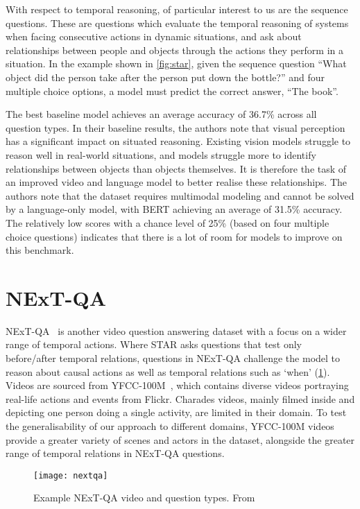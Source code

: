 With respect to temporal reasoning, of particular interest to us are the
sequence questions. These are questions which evaluate the temporal reasoning
of systems when facing consecutive actions in dynamic situations, and ask about
relationships between people and objects through the actions they perform in a
situation. In the example shown in \cref{fig:star}, given the sequence question
``What object did the person take after the person put down the bottle?'' and
four multiple choice options, a model must predict the correct answer, ``The
book''.

The best baseline model achieves an average accuracy of 36.7\% across all
question types. In their baseline results, the authors note that visual
perception has a significant impact on situated reasoning. Existing vision
models struggle to reason well in real-world situations, and models struggle
more to identify relationships between objects than objects themselves. It is
therefore the task of an improved video and language model to better realise
these relationships. The authors note that the dataset requires multimodal
modeling and cannot be solved by a language-only model, with BERT achieving an
average of 31.5\% accuracy. The relatively low scores with a chance level of
25\% (based on four multiple choice questions) indicates that there is a lot of
room for models to improve on this benchmark.

\section{NExT-QA}
\label{sec:nextqa}
NExT-QA~\citep{xiao2021nextqa} is another video question answering dataset with
a focus on a wider range of temporal actions. Where STAR asks questions that
test only before/after temporal relations, questions in NExT-QA challenge the
model to reason about causal actions as well as temporal relations such as
`when' (\cref{fig:nextqa}). Videos are sourced from
YFCC-100M~\citep{thomee2016yfcc100m}, which contains diverse videos portraying
real-life actions and events from Flickr. Charades videos, mainly filmed inside
and depicting one person doing a single activity, are limited in their domain.
To test the generalisability of our approach to different domains, YFCC-100M
videos provide a greater variety of scenes and actors in the dataset, alongside
the greater range of temporal relations in NExT-QA questions.

\begin{figure}[tp]
	\centering
	\texttt{[image: nextqa]}
	\caption{Example NExT-QA video and question types.
		From~\citet{xiao2021nextqa}}
	\label{fig:nextqa}
\end{figure}

